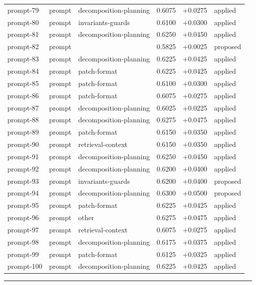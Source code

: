 \begin{center}
\begin{longtable}{llp{5.2cm}rrl}
prompt-79 & prompt & decomposition-planning & 0.6075 & +0.0275 & applied \\
prompt-80 & prompt & invariants-guards & 0.6100 & +0.0300 & applied \\
prompt-81 & prompt & decomposition-planning & 0.6250 & +0.0450 & applied \\
prompt-82 & prompt &  & 0.5825 & +0.0025 & proposed \\
prompt-83 & prompt & decomposition-planning & 0.6225 & +0.0425 & applied \\
prompt-84 & prompt & patch-format & 0.6225 & +0.0425 & applied \\
prompt-85 & prompt & patch-format & 0.6100 & +0.0300 & applied \\
prompt-86 & prompt & patch-format & 0.6075 & +0.0275 & applied \\
prompt-87 & prompt & decomposition-planning & 0.6025 & +0.0225 & applied \\
prompt-88 & prompt & decomposition-planning & 0.6275 & +0.0475 & applied \\
prompt-89 & prompt & patch-format & 0.6150 & +0.0350 & applied \\
prompt-90 & prompt & retrieval-context & 0.6150 & +0.0350 & applied \\
prompt-91 & prompt & decomposition-planning & 0.6250 & +0.0450 & applied \\
prompt-92 & prompt & decomposition-planning & 0.6200 & +0.0400 & applied \\
prompt-93 & prompt & invariants-guards & 0.6200 & +0.0400 & proposed \\
prompt-94 & prompt & decomposition-planning & 0.6300 & +0.0500 & proposed \\
prompt-95 & prompt & patch-format & 0.6225 & +0.0425 & applied \\
prompt-96 & prompt & other & 0.6275 & +0.0475 & applied \\
prompt-97 & prompt & retrieval-context & 0.6075 & +0.0275 & applied \\
prompt-98 & prompt & decomposition-planning & 0.6175 & +0.0375 & applied \\
prompt-99 & prompt & patch-format & 0.6125 & +0.0325 & applied \\
prompt-100 & prompt & decomposition-planning & 0.6225 & +0.0425 & applied \\
\bottomrule\end{longtable}\end{center}
\par\bigskip\hrule\bigskip
